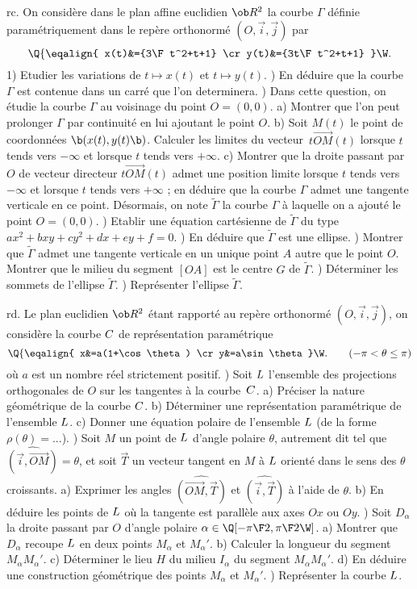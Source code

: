 \exo [Level=1,Fight=3,Learn=3,Field=\Coniques,Type=\Problèmes,Origin=] rc. 
On considère dans le plan affine euclidien $\ob R^2$ la courbe $\Gamma$ définie paramétriquement dans le repère orthonormé $(O,\vec i,\vec j)$ par 
$$
\Q\{\eqalign{
x(t)&={3\F t^2+t+1}
\cr
y(t)&={3t\F t^2+t+1}
}\W.
$$ 
1) Etudier les variations de $t\mapsto x(t)$ et $t\mapsto y(t)$. ) En déduire que la courbe $\Gamma$ est contenue dans un carré que l'on determinera. ) Dans cette question, on étudie la courbe $\Gamma$ au voisinage du point $O=(0,0)$. \pn
a) Montrer que l'on peut prolonger $\Gamma$ par continuité en lui ajoutant le point $O$. \pn
b) Soit $M(t)$ le point de coordonnées $\b(x(t),y(t)\b)$. Calculer les limites du vecteur~$t\vec{OM}(t)$ lorsque $t$ tends vers $-\infty$ et lorsque $t$ tends vers $+\infty$. \pn
c) Montrer que la droite passant par $O$ de vecteur directeur $t\vec{OM}(t)$ admet une position limite lorsque  $t$ tends vers $-\infty$ et lorsque $t$ tends vers $+\infty$ ; en déduire que la courbe $\Gamma$ admet une tangente verticale en ce point. \pn
Désormais, on note $\tilde \Gamma$ la courbe $\Gamma$ à laquelle on a ajouté le point $O=(0,0)$. ) Etablir une équation cartésienne de $\tilde \Gamma$ du type $ax^2+bxy+cy^2+dx+ey+f=0$. ) En déduire que $\tilde \Gamma$ est une ellipse. ) Montrer que $\tilde \Gamma$ admet une tangente verticale en un unique point $A$ autre que le point $O$. 
Montrer que le milieu du segment $[OA]$ est le centre $G$ de $\tilde \Gamma$. ) Déterminer les sommets de l'ellipse $\tilde\Gamma$. ) Représenter l'ellipse $\tilde \Gamma$. 

\exo  [Level=1,Fight=3,Learn=3,Field=\CourbesParamétréesCartésiennes,Type=\Problèmes,Origin=] rd. 
Le plan euclidien $\ob R^2$ étant rapporté au repère orthonormé $(O,\vec i,\vec j)$, on considère la courbe $\sc C$ de représentation paramétrique 
$$
\Q\{\eqalign{
x&=a(1+\cos\theta)
\cr
y&=a\sin\theta
}\W.\qquad(-\pi<\theta\le\pi)
$$ 
où $a$ est un nombre réel strictement positif. ) Soit $\sc L$ l'ensemble des projections orthogonales de $O$ sur les tangentes à la courbe~$\sc C$. \pn
a) Préciser la nature géométrique de la courbe $\sc C$. \pn
b) Déterminer une représentation paramétrique de l'ensemble $\sc L$. \pn
c) Donner une équation polaire de l'ensemble $\sc L$ (de la forme $\rho(\theta)=...$). ) Soit $M$ un point de $\sc L$ d'angle polaire $\theta$, autrement dit tel que $\widehat{(\vec i,\vec{OM})}=\theta$,  et soit $\vec T$ un vecteur tangent en $M$ à $\sc L$ orienté dans le sens des $\theta$ croissants. \pn
a) Exprimer les angles $\widehat{(\vec{OM},\vec T)}$ et $\widehat{(\vec i,\vec T)}$ à l'aide de $\theta$. \pn
b) En déduire les points de $\sc L$ où la tangente est parallèle aux axes $Ox$ ou $Oy$. ) Soit $D_\alpha$ la droite passant par $O$ d'angle polaire $\alpha\in\Q[-{\pi\F2},{\pi\F2}\W]$. \pn
a) Montrer que $D_\alpha$ recoupe $\sc L$ en deux points $M_\alpha$ et $M_\alpha'$. \pn
b) Calculer la longueur du segment $M_\alpha M_\alpha'$. \pn
c) Déterminer le lieu $H$ du milieu $I_\alpha$ du segment $M_\alpha M_\alpha'$. \pn
d) En déduire une construction géométrique des points $M_\alpha$ et $M_\alpha'$. ) Représenter la courbe $\sc L$. 

